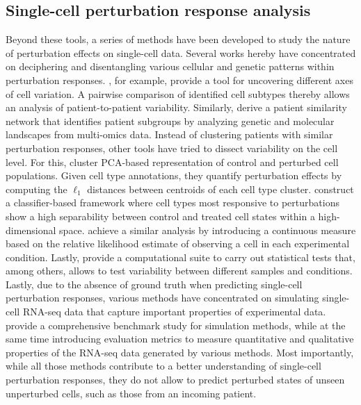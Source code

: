 \subsection{Single-cell perturbation response analysis}
Beyond these tools, a series of methods have been developed to study the nature of perturbation effects on single-cell data. Several works hereby have concentrated on deciphering and disentangling various cellular and genetic patterns within perturbation responses.
\citet{chen2020uncovering}, for example, provide a tool for uncovering different axes of cell variation. A pairwise comparison of identified cell subtypes thereby allows an analysis of patient-to-patient variability.
Similarly, \citet{bhalla2021patient} derive a patient similarity network that identifies patient subgroups by analyzing genetic and molecular landscapes from multi-omics data.
Instead of clustering patients with similar perturbation responses, other tools have tried to dissect variability on the cell level.
For this, \citet{chari2021whole} cluster PCA-based representation of control and perturbed cell populations. Given cell type annotations, they quantify perturbation effects by computing the $\ell_1$ distances between centroids of each cell type cluster.
\citet{skinnider2021cell} construct a classifier-based framework where cell types most responsive to perturbations show a high separability between control and treated cell states within a high-dimensional space. \citet{burkhardt2021quantifying} achieve a similar analysis by introducing a continuous measure based on the relative likelihood estimate of  observing a cell in each experimental condition. Lastly, \citet{petukhov2022case} provide a computational suite to carry out statistical tests that, among others, allows to test variability between different samples and conditions.
Lastly, due to the absence of ground truth when predicting single-cell perturbation responses, various methods have concentrated on simulating single-cell RNA-seq data that capture important properties of experimental data. \citet{cao2021benchmark} provide a comprehensive benchmark study for simulation methods, while at the same time introducing evaluation metrics to measure quantitative and qualitative properties of the RNA-seq data generated by various methods. 
Most importantly, while all those methods contribute to a better understanding of single-cell perturbation responses, they do not allow to predict perturbed states of unseen unperturbed cells, such as those from an incoming patient.



